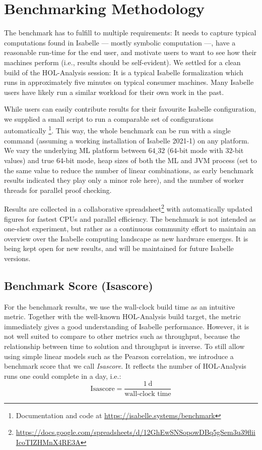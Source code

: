 
\section{Benchmarking Methodology}\label{sec:benchmark}
The benchmark has to fulfill to multiple requirements:
It needs to capture typical computations found in Isabelle
--- mostly symbolic computation ---,
have a reasonable run-time for the end user,
and motivate users to want to see how their machines perform
(i.e., results should be self-evident).
We settled for a clean build of the HOL-Analysis session:
It is a typical Isabelle formalization
which runs in approximately five minutes on typical consumer machines.
Many Isabelle users have likely run a similar workload for their own work in the past.

While users can easily contribute results for their favourite Isabelle configuration,
we supplied a small script to run a comparable set of configurations automatically
\footnote{Documentation and code at \url{https://isabelle.systems/benchmark}}.
This way,
the whole benchmark can be run with a single command
(assuming a working installation of Isabelle 2021-1)
on any platform.
We vary the underlying ML platform between $64\_32$ ($64$-bit mode with $32$-bit values) and true \num{64}-bit mode,
heap sizes of both the ML and JVM process
(set to the same value to reduce the number of linear combinations,
as early benchmark results indicated they play only a minor role here),
and the number of worker threads for parallel proof checking.

Results are collected in a collaborative spreadsheet\footnote{\url{https://docs.google.com/spreadsheets/d/12GhEwSNSopowDBq5gSem3u39fliiIcoTIZHMnX4RE3A}}
with automatically updated figures for fastest CPUs and parallel efficiency.
The benchmark is not intended as one-shot experiment,
but rather as a continuous community effort
to maintain an overview over the Isabelle computing landscape as new hardware emerges.
It is being kept open for new results, and will be maintained for future Isabelle versions.

\subsection{Benchmark Score (Isascore)}
For the benchmark results,
we use the wall-clock build time as an intuitive metric.
Together with the well-known HOL-Analysis build target,
the metric immediately gives a good understanding of Isabelle performance.
However, it is not well suited to compare to other metrics such as throughput,
because the relationship between time to solution and throughput is inverse.
To still allow using simple linear models such as the Pearson correlation,
we introduce a benchmark score that we call \emph{Isascore}.
It reflects the number of HOL-Analysis runs one could complete in a day, i.e.:
\begin{equation}
    \text{Isascore}=\frac{\SI{1}{\day}}{\text{wall-clock time}}
\end{equation}

